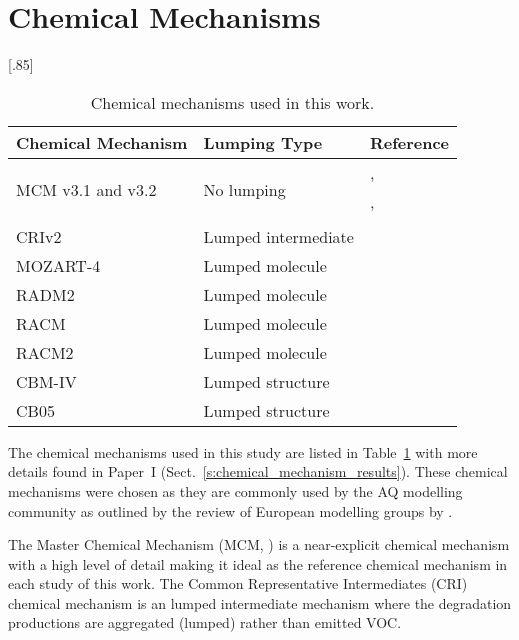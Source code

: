 \section{Chemical Mechanisms} \label{s:chemical_mechanisms}
\begin{table}[t]%
    \begin{center}%
        \caption{Chemical mechanisms used in this work.}%
        \scalebox{.85}[.85]{\begin{tabular}{lll}%
                \hline \hline
                \textbf{Chemical Mechanism} & \textbf{Lumping Type} & \textbf{Reference} \\
                \hline \hline
                \multirow{3}{*}{MCM v3.1 and v3.2} & \multirow{3}{*}{No lumping} & \citet{Jenkin:1997}, \citet{Jenkin:2003} \\
                & & \citet{Saunders:2003}, \citet{Bloss:2005} \\
                & & \citet{MCM_Site} \\
                CRIv2 & Lumped intermediate & \citet{Jenkin:2008} \\
                MOZART-4 & Lumped molecule & \citet{Emmons:2010} \\
                RADM2 & Lumped molecule & \citet{Stockwell:1990} \\
                RACM & Lumped molecule & \citet{Stockwell:1997} \\
                RACM2 & Lumped molecule & \citet{Goliff:2013} \\
                CBM-IV & Lumped structure & \citet{Gery:1989} \\
                CB05 & Lumped structure & \citet{Yarwood:2005} \\
                \hline \hline
            \end{tabular}%
        }%
        \label{t:mechanisms}%
    \end{center}%
\end{table}%
The chemical mechanisms used in this study are listed in Table~\ref{t:mechanisms} with more details found in Paper~I (Sect.~\ref{s:chemical_mechanism_results}).
These chemical mechanisms were chosen as they are commonly used by the AQ modelling community as outlined by the review of European modelling groups by \citet{Baklanov:2014}.

The Master Chemical Mechanism (MCM, \citet{Jenkin:1997, Jenkin:2003, Saunders:2003, Bloss:2005, MCM_Site}) is a near-explicit chemical mechanism with a high level of detail making it ideal as the reference chemical mechanism in each study of this work.
The Common Representative Intermediates (CRI) chemical mechanism \citep{Jenkin:2008} is an lumped intermediate mechanism where the degradation productions are aggregated (lumped) rather than emitted VOC.

